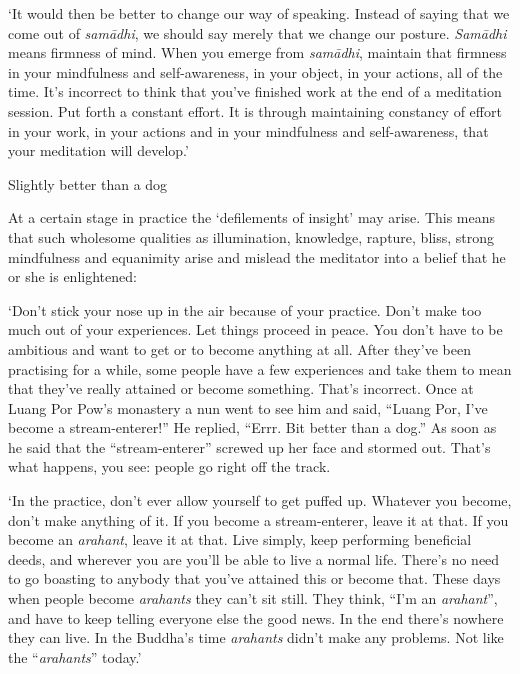 `It would then be better to change our way of speaking. Instead of
saying that we come out of \emph{samādhi}, we should say merely that we
change our posture. \emph{Samādhi} means firmness of mind. When you
emerge from \emph{samādhi}, maintain that firmness in your mindfulness
and self-awareness, in your object, in your actions, all of the time.
It's incorrect to think that you've finished work at the end of a
meditation session. Put forth a constant effort. It is through
maintaining constancy of effort in your work, in your actions and in
your mindfulness and self-awareness, that your meditation will develop.'

Slightly better than a dog

At a certain stage in practice the `defilements of insight' may arise.
This means that such wholesome qualities as illumination, knowledge,
rapture, bliss, strong mindfulness and equanimity arise and mislead the
meditator into a belief that he or she is enlightened:

`Don't stick your nose up in the air because of your practice. Don't
make too much out of your experiences. Let things proceed in peace. You
don't have to be ambitious and want to get or to become anything at all.
After they've been practising for a while, some people have a few
experiences and take them to mean that they've really attained or become
something. That's incorrect. Once at Luang Por Pow's monastery a nun
went to see him and said, ``Luang Por, I've become a stream-enterer!''
He replied, ``Errr. Bit better than a dog.'' As soon as he said that the
``stream-enterer'' screwed up her face and stormed out. That's what
happens, you see: people go right off the track.

`In the practice, don't ever allow yourself to get puffed up. Whatever
you become, don't make anything of it. If you become a stream-enterer,
leave it at that. If you become an \emph{arahant}, leave it at that.
Live simply, keep performing beneficial deeds, and wherever you are
you'll be able to live a normal life. There's no need to go boasting to
anybody that you've attained this or become that. These days when people
become \emph{arahants} they can't sit still. They think, ``I'm an
\emph{arahant}'', and have to keep telling everyone else the good news.
In the end there's nowhere they can live. In the Buddha's time
\emph{arahants} didn't make any problems. Not like the
``\emph{arahants}'' today.'

